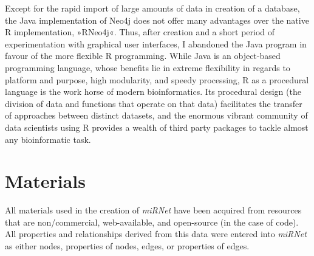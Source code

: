 Except for the rapid import of large amounts of data in creation of a database, the Java implementation of Neo4j does not offer many advantages over the native R implementation, »RNeo4j«. Thus, after creation and a short period of experimentation with graphical user interfaces, I abandoned the Java program in favour of the more flexible R programming. While Java is an object-based programming language, whose benefits lie in extreme flexibility in regards to platform and purpose, high modularity, and speedy processing, R as a procedural language is the work horse of modern bioinformatics. Its procedural design (the division of data and functions that operate on that data) facilitates the transfer of approaches between distinct datasets, and the enormous vibrant community of data scientists using R provides a wealth of third party packages to tackle almost any bioinformatic task.

\section{Materials}
All materials used in the creation of \textit{miRNet} have been acquired from resources that are non\-/commercial, web-available, and open-source (in the case of code). All properties and relationships derived from this data were entered into \textit{miRNet} as either nodes, properties of nodes, edges, or properties of edges. 


